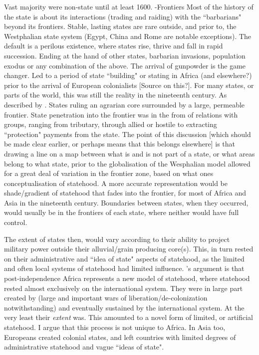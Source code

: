\documentclass[12pt]{article}
\begin{document}
Vast majority were non-state until at least 1600. -Frontiers Most of the history
of the state is about its interactions (trading and raiding) with the
``barbarians" beyond its frontiers. Stable, lasting states are rare outside, and
prior to, the Westphalian state system (Egypt, China and Rome are notable
exceptions). The default is a perilous existence, where states rise, thrive and
fall in rapid succession. Ending at the hand of other states, barbarian
invasions, population exodus or any combination of the above. The arrival of
gunpowder is the game changer. Led to a period of state ``building" or stating in
Africa (and elsewhere?) prior to the arrival of European colonialists [Source on
this?]. For many states, or parts of the world, this was still the reality in
the nineteenth century. As described by	\citet{Scott2009}. States ruling an
agrarian core surrounded by a large, permeable frontier. State penetration into
the frontier was in the from of relations with groups, ranging from tributary,
through allied or hostile to extracting ``protection" payments from the state.
The point of this discussion [which should be made clear earlier, or perhaps
means that this belongs elsewhere] is that drawing a line on a map between what
is and is not part of a state, or what areas belong to what state, prior to the
globalisation of the Wesphalian model allowed for a great deal of variation in
the frontier zone, based on what ones conceptualisation of statehood. A more
accurate representation would be shade/gradient of statehood that fades into the
frontier, for most of Africa and Asia in the nineteenth century. Boundaries
between states, when they occurred, would usually be in the frontiers of each
state, where neither would have full control.

The extent of states then, would vary according to their ability to project
military power outside their alluvial/grain producing core(s). This, in turn
rested on their administrative and ``idea of state" aspects of statehood, as the
limited and often local systems of statehood had limited influence.
\citet{Clapham1996}'s argument is that post-independence Africa represents a new
model of statehood, where statehood rested almost exclusively on the
international system. They were in large part created by (large and important
wars of liberation/de-colonization notwithstanding) and eventually sustained by
the international system. At the very least their \textit{extent} was. This
amounted to a novel form of limited, or artificial statehood. I argue that this
process is not unique to Africa. In Asia too, Europeans created colonial states,
and left countries with limited degrees of administrative statehood and vague
``ideas of state".
\end{document}
